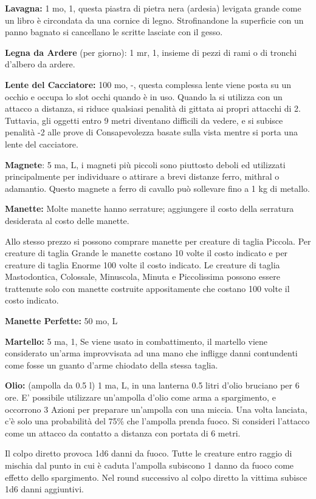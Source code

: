 \documentclass[a4paper,11pt,twoside,openany]{book}
\begin{document}
\textbf{Lavagna:} 1 mo, 1, questa piastra di pietra nera (ardesia) levigata grande come un libro è circondata da una cornice di legno. Strofinandone la superficie con un panno bagnato si cancellano le scritte lasciate con il gesso.

\textbf{Legna da Ardere} (per giorno): 1 mr, 1, insieme di pezzi di rami o di tronchi d'albero da ardere.

\textbf{Lente del Cacciatore:} 100 mo, -, questa complessa lente viene posta su un occhio e occupa lo slot occhi quando è in uso. Quando la si utilizza con un attacco a distanza, si riduce qualsiasi penalità di gittata ai propri attacchi di 2. Tuttavia, gli oggetti entro 9 metri diventano difficili da vedere, e si subisce penalità -2 alle prove di Consapevolezza basate sulla vista mentre si porta una lente del cacciatore.

\textbf{Magnete}: 5 ma, L, i magneti più piccoli sono piuttosto deboli ed utilizzati principalmente per individuare o attirare a brevi distanze ferro, mithral o adamantio. Questo magnete a ferro di cavallo può sollevare fino a 1 kg di metallo.

\textbf{Manette:} Molte manette hanno serrature; aggiungere il costo della serratura desiderata al costo delle manette.

Allo stesso prezzo si possono comprare manette per creature di taglia Piccola. Per creature di taglia Grande le manette costano 10 volte il costo indicato e per creature di taglia Enorme 100 volte il costo indicato. Le creature di taglia Mastodontica, Colossale, Minuscola, Minuta e Piccolissima possono essere trattenute solo con manette costruite appositamente che costano 100 volte il costo indicato.

\textbf{Manette Perfette:} 50 mo, L

\textbf{Martello:} 5 ma, 1, Se viene usato in combattimento, il martello viene considerato un'arma improvvisata ad una mano che infligge danni contundenti come fosse un guanto d'arme chiodato della stessa taglia.

\textbf{Olio:} (ampolla da 0.5 l) 1 ma, L, in una lanterna 0.5 litri d'olio bruciano per 6 ore. E' possibile utilizzare un'ampolla d'olio come arma a spargimento, e occorrono 3 Azioni per preparare un'ampolla con una miccia. Una volta lanciata, c'è solo una probabilità del 75\% che l'ampolla prenda fuoco. Si consideri l'attacco come un attacco da contatto a distanza con portata di 6 metri.

Il colpo diretto provoca 1d6 danni da fuoco. Tutte le creature entro raggio di mischia dal punto in cui è caduta l'ampolla subiscono 1 danno da fuoco come effetto dello spargimento. Nel round successivo al colpo diretto la vittima subisce 1d6 danni aggiuntivi.
\end{document}
